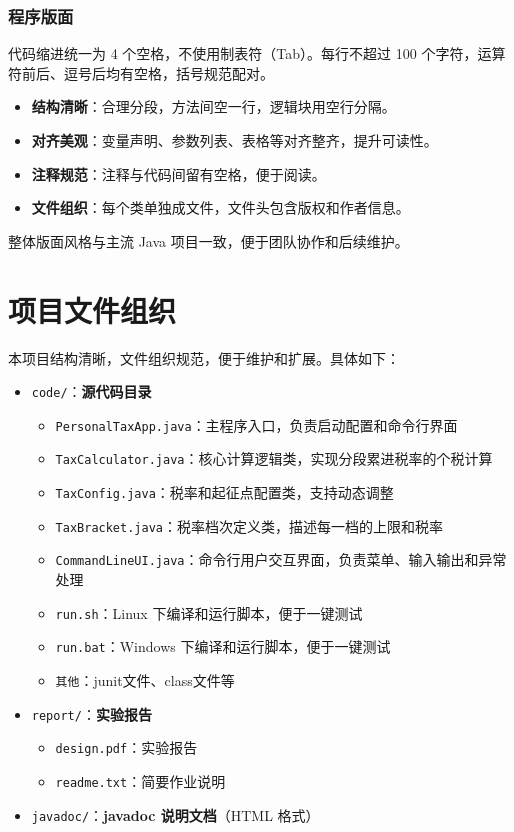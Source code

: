 \subsection{程序版面}
代码缩进统一为 4 个空格，不使用制表符（Tab）。每行不超过 100 个字符，运算符前后、逗号后均有空格，括号规范配对。
\begin{itemize}
	\item \textbf{结构清晰}：合理分段，方法间空一行，逻辑块用空行分隔。
	\item \textbf{对齐美观}：变量声明、参数列表、表格等对齐整齐，提升可读性。
	\item \textbf{注释规范}：注释与代码间留有空格，便于阅读。
	\item \textbf{文件组织}：每个类单独成文件，文件头包含版权和作者信息。
\end{itemize}
整体版面风格与主流 Java 项目一致，便于团队协作和后续维护。


\chapter{项目文件组织}
本项目结构清晰，文件组织规范，便于维护和扩展。具体如下：
\begin{itemize}
	\item \texttt{code/}：\textbf{源代码目录}
	\begin{itemize}
		\item \texttt{PersonalTaxApp.java}：主程序入口，负责启动配置和命令行界面
		\item \texttt{TaxCalculator.java}：核心计算逻辑类，实现分段累进税率的个税计算
		\item \texttt{TaxConfig.java}：税率和起征点配置类，支持动态调整
		\item \texttt{TaxBracket.java}：税率档次定义类，描述每一档的上限和税率
		\item \texttt{CommandLineUI.java}：命令行用户交互界面，负责菜单、输入输出和异常处理
		\item \texttt{run.sh}：Linux 下编译和运行脚本，便于一键测试
		\item \texttt{run.bat}：Windows 下编译和运行脚本，便于一键测试
		\item \texttt{其他}：junit文件、class文件等
	\end{itemize}

	\item \texttt{report/}：\textbf{实验报告}
	\begin{itemize}
		\item \texttt{design.pdf}：实验报告
		\item \texttt{readme.txt}：简要作业说明
	\end{itemize}
	\item \texttt{javadoc/}：\textbf{javadoc 说明文档}（HTML 格式）
\end{itemize}


